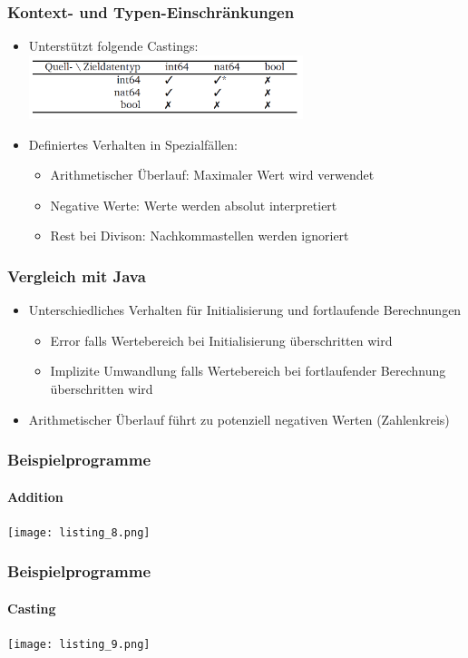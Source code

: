 \documentclass{beamer}
\begin{document}
    \begin{frame}
        \frametitle{Kontext- und Typen-Einschränkungen}
        \begin{itemize}
            \item Unterstützt folgende Castings:
            {\includegraphics[width=8cm]{listing_7.png}}
            \item Definiertes Verhalten in Spezialfällen:
                \begin{itemize}
                    \item Arithmetischer Überlauf: Maximaler Wert wird verwendet
                    \item Negative Werte: Werte werden absolut interpretiert
                    \item Rest bei Divison: Nachkommastellen werden ignoriert
                \end{itemize}
        \end{itemize}
        \vspace{30}
    \end{frame}

    \begin{frame}
        \frametitle{Vergleich mit Java}
        \begin{itemize}
            \item Unterschiedliches Verhalten für Initialisierung und fortlaufende Berechnungen
            \begin{itemize}
                \item Error falls Wertebereich bei Initialisierung überschritten wird
                \item Implizite Umwandlung falls Wertebereich bei fortlaufender Berechnung überschritten wird
            \end{itemize}
            \item Arithmetischer Überlauf führt zu potenziell negativen Werten (Zahlenkreis)
        \end{itemize}
        \vspace{30}
    \end{frame}

    \begin{frame}
        \frametitle{Beispielprogramme}
        \framesubtitle{Addition}
        {\texttt{[image: listing\_8.png]}}
        \vspace{30}
    \end{frame}

    \begin{frame}
        \frametitle{Beispielprogramme}
        \framesubtitle{Casting}
        {\texttt{[image: listing\_9.png]}}
        \vspace{30}
    \end{frame}
\end{document}
